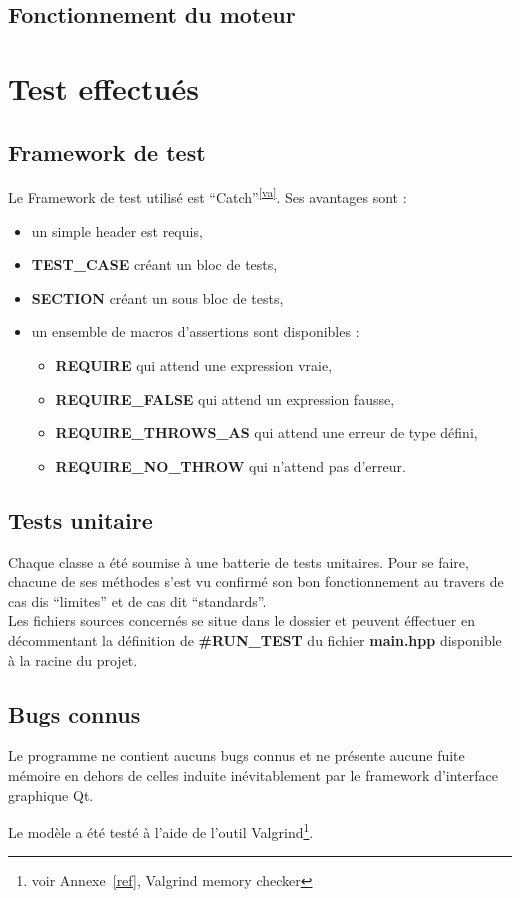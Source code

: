 \documentclass[a4paper,11pt]{report}
\begin{document}
\section[Moteur de jeu]{Fonctionnement du moteur}
\chapter{Test effectués}
\section{Framework de test}
Le Framework de test utilisé est
``Catch''\textsuperscript{\ref{va}}. Ses avantages
sont :
\begin{itemize}
	\item un simple header est requis,
	\item \textbf{TEST\_CASE} créant un bloc de tests,
	\item \textbf{SECTION} créant un sous bloc de tests,
	\item un ensemble de macros d'assertions sont disponibles :
		\begin{itemize}
			\item\textbf{REQUIRE} qui attend une expression vraie,
			\item\textbf{REQUIRE\_FALSE} qui attend un expression fausse,
			\item\textbf{REQUIRE\_THROWS\_AS} qui attend une erreur de type défini,
			\item\textbf{REQUIRE\_NO\_THROW} qui n'attend pas d'erreur.
		\end{itemize}
\end{itemize} 
\section{Tests unitaire}
Chaque classe a été soumise à une batterie de tests unitaires. Pour se faire,
chacune de ses méthodes s'est vu confirmé son bon fonctionnement au travers de
cas dis ``limites'' et de cas dit ``standards''. \\

Les fichiers sources concernés se situe dans le dossier  et peuvent
éffectuer en décommentant la définition de \textbf{\#RUN\_TEST} du fichier
\textbf{main.hpp} disponible à la racine du projet.
\section{Bugs connus}
\begin{center}
	Le programme ne contient aucuns bugs connus et ne présente aucune fuite
	mémoire en dehors de celles induite inévitablement par le framework
	d'interface graphique Qt.

Le modèle a été testé à l'aide de l'outil Valgrind\footnote{voir Annexe~\ref{ref},
Valgrind memory checker}.
\end{center}
\newpage
\end{document}
